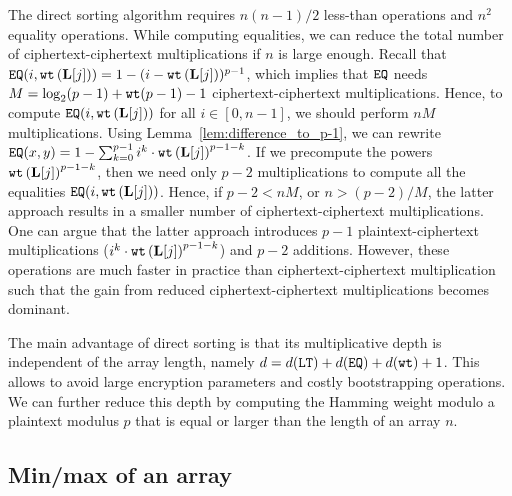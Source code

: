 	The direct sorting algorithm requires $n(n-1)/2$ less-than operations and $n^2$ equality operations.
	While computing equalities, we can reduce the total number of ciphertext-ciphertext multiplications if $n$ is large enough.
	Recall that $\mathtt{EQ}(i,\texttt{wt}\left(\mathbf{L}[j]\right)) = 1 - (i-\texttt{wt}\left(\mathbf{L}[j]\right))^{p-1}$, which implies that $\mathtt{EQ}$ needs $M = \log_2(p-1) + \texttt{wt}(p-1) - 1$ ciphertext-ciphertext multiplications.
	Hence, to compute $\mathtt{EQ}(i,\texttt{wt}\left(\mathbf{L}[j]\right))$ for all $i \in [0,n-1]$, we should perform $n M$ multiplications.
	Using Lemma~\ref{lem:difference_to_p-1}, we can rewrite $\mathtt{EQ}(x,y) = 1 - \sum_{k=0}^{p-1} i^k \cdot \texttt{wt}\left(\mathbf{L}[j]\right)^{p-1-k}$.
	If we precompute the powers $\texttt{wt}\left(\mathbf{L}[j]\right)^{p-1-k}$, then we need only $p-2$ multiplications to compute all the equalities $\mathtt{EQ}(i,\texttt{wt}\left(\mathbf{L}[j]\right))$.
	Hence, if $p-2 < nM$, or $n > (p-2)/M$, the latter approach results in a smaller number of ciphertext-ciphertext multiplications.
	One can argue that the latter approach introduces $p-1$ plaintext-ciphertext multiplications ($i^k \cdot \texttt{wt}\left(\mathbf{L}[j]\right)^{p-1-k}$) and $p-2$ additions. 
	However, these operations are much faster in practice than ciphertext-ciphertext multiplication such that the gain from reduced ciphertext-ciphertext multiplications becomes dominant. 
	
	The main advantage of direct sorting is that its multiplicative depth is independent of the array length, namely $d = d(\mathtt{LT}) + d(\mathtt{EQ}) + d(\texttt{wt}) + 1$.
	This allows to avoid large encryption parameters and costly bootstrapping operations.
	We can further reduce this depth by computing the Hamming weight modulo a plaintext modulus $p$ that is equal or larger than the length of an array $n$.

\subsection{Min/max of an array}
\label{sec:min/max}

